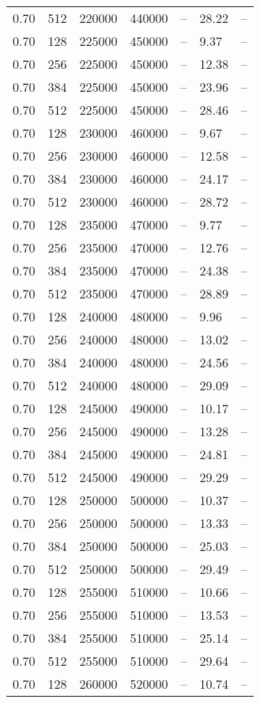 \begin{tabular}{l|l|l|l|l|l|l}
0.70 & 512 & 220000 & 440000 & -- & 28.22 & --\\
0.70 & 128 & 225000 & 450000 & -- &  9.37 & --\\
0.70 & 256 & 225000 & 450000 & -- & 12.38 & --\\
0.70 & 384 & 225000 & 450000 & -- & 23.96 & --\\
0.70 & 512 & 225000 & 450000 & -- & 28.46 & --\\
0.70 & 128 & 230000 & 460000 & -- &  9.67 & --\\
0.70 & 256 & 230000 & 460000 & -- & 12.58 & --\\
0.70 & 384 & 230000 & 460000 & -- & 24.17 & --\\
0.70 & 512 & 230000 & 460000 & -- & 28.72 & --\\
0.70 & 128 & 235000 & 470000 & -- &  9.77 & --\\
0.70 & 256 & 235000 & 470000 & -- & 12.76 & --\\
0.70 & 384 & 235000 & 470000 & -- & 24.38 & --\\
0.70 & 512 & 235000 & 470000 & -- & 28.89 & --\\
0.70 & 128 & 240000 & 480000 & -- &  9.96 & --\\
0.70 & 256 & 240000 & 480000 & -- & 13.02 & --\\
0.70 & 384 & 240000 & 480000 & -- & 24.56 & --\\
0.70 & 512 & 240000 & 480000 & -- & 29.09 & --\\
0.70 & 128 & 245000 & 490000 & -- & 10.17 & --\\
0.70 & 256 & 245000 & 490000 & -- & 13.28 & --\\
0.70 & 384 & 245000 & 490000 & -- & 24.81 & --\\
0.70 & 512 & 245000 & 490000 & -- & 29.29 & --\\
0.70 & 128 & 250000 & 500000 & -- & 10.37 & --\\
0.70 & 256 & 250000 & 500000 & -- & 13.33 & --\\
0.70 & 384 & 250000 & 500000 & -- & 25.03 & --\\
0.70 & 512 & 250000 & 500000 & -- & 29.49 & --\\
0.70 & 128 & 255000 & 510000 & -- & 10.66 & --\\
0.70 & 256 & 255000 & 510000 & -- & 13.53 & --\\
0.70 & 384 & 255000 & 510000 & -- & 25.14 & --\\
0.70 & 512 & 255000 & 510000 & -- & 29.64 & --\\
0.70 & 128 & 260000 & 520000 & -- & 10.74 & --\\

\end{tabular}
